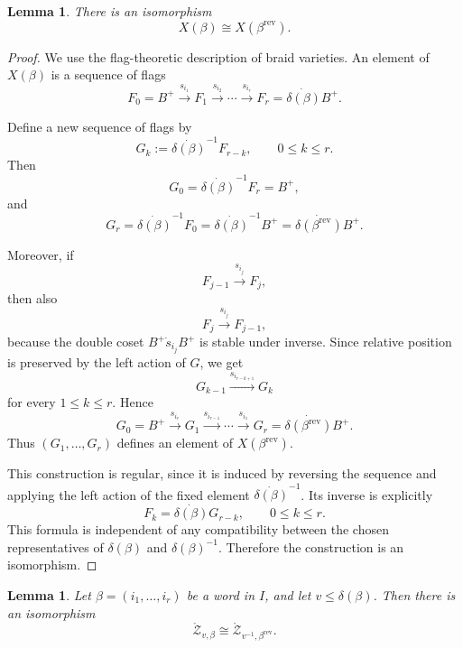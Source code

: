 \documentclass[12pt, reqno]{amsart}
\theoremstyle{plain}
\newtheorem{lemma}[theorem]{Lemma}
\theoremstyle{definition}
\numberwithin{equation}{section}
\begin{document}
\begin{lemma}\label{lem:betarev}
There is an isomorphism
\[
X(\beta)\cong X(\beta^{\operatorname{rev}}).
\]
\end{lemma}

\begin{proof}
We use the flag-theoretic description of braid varieties. An element of
\(X(\beta)\) is a sequence of flags
\[
F_0=B^+
\xrightarrow{s_{i_1}}
F_1
\xrightarrow{s_{i_2}}
\cdots
\xrightarrow{s_{i_r}}
F_r
=
\dot{\delta(\beta)}B^+.
\]

Define a new sequence of flags by
\[
G_k:=\dot{\delta(\beta)}^{-1}F_{r-k},
\qquad 0\le k\le r.
\]
Then
\[
G_0
=
\dot{\delta(\beta)}^{-1}F_r
=
B^+,
\]
and
\[
G_r
=
\dot{\delta(\beta)}^{-1}F_0
=
\dot{\delta(\beta)}^{-1}B^+
=
\dot{\delta(\beta^{\operatorname{rev}})}B^+.
\]

Moreover, if
\[
F_{j-1}\xrightarrow{s_{i_j}}F_j,
\]
then also
\[
F_j\xrightarrow{s_{i_j}}F_{j-1},
\]
because the double coset \(B^+\dot{s}_{i_j}B^+\) is stable under inverse.
Since relative position is preserved by the left action of \(G\), we get
\[
G_{k-1}
\xrightarrow{s_{i_{r-k+1}}}
G_k
\]
for every \(1\le k\le r\). Hence
\[
G_0=B^+
\xrightarrow{s_{i_r}}
G_1
\xrightarrow{s_{i_{r-1}}}
\cdots
\xrightarrow{s_{i_1}}
G_r
=
\dot{\delta(\beta^{\operatorname{rev}})}B^+.
\]
Thus \((G_1,\dots,G_r)\) defines an element of \(X(\beta^{\operatorname{rev}})\).

This construction is regular, since it is induced by reversing the sequence and
applying the left action of the fixed element \(\dot{\delta(\beta)}^{-1}\).
Its inverse is explicitly
\[
F_k=\dot{\delta(\beta)}G_{r-k},\qquad 0\leq k\leq r.
\]
This formula is independent of any compatibility between the chosen
representatives of \(\delta(\beta)\) and \(\delta(\beta)^{-1}\).
Therefore the construction is an isomorphism.
\end{proof}

\begin{lemma}\label{lem:zv-1beta}
Let \(\beta=(i_1,\dots,i_r)\) be a word in \(I\), and let
\(v\leq\delta(\beta)\). Then there is an isomorphism
\[
\mathring{\mathcal{Z}}_{v,\beta}
\cong
\mathring{\mathcal{Z}}_{v^{-1},\beta^{\operatorname{rev}}}.
\]
\end{lemma}
\end{document}
